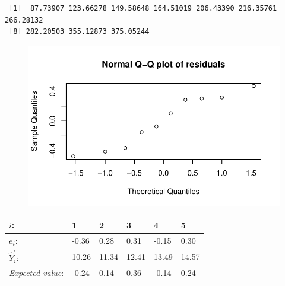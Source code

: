 \documentclass[
  letterpaper,
  DIV=11,
  numbers=noendperiod]{scrartcl}
\newenvironment{Shaded}{\begin{snugshade}}{\end{snugshade}}
\newcommand{\AttributeTok}[1]{\textcolor[rgb]{0.40,0.45,0.13}{#1}}
\newcommand{\FunctionTok}[1]{\textcolor[rgb]{0.28,0.35,0.67}{#1}}
\newcommand{\NormalTok}[1]{\textcolor[rgb]{0.00,0.23,0.31}{#1}}
\newcommand{\OtherTok}[1]{\textcolor[rgb]{0.00,0.23,0.31}{#1}}
\newcommand{\SpecialCharTok}[1]{\textcolor[rgb]{0.37,0.37,0.37}{#1}}
\newcommand{\StringTok}[1]{\textcolor[rgb]{0.13,0.47,0.30}{#1}}
\begin{document}
\begin{Shaded}
\end{Shaded}

\begin{verbatim}
 [1]  87.73907 123.66278 149.58648 164.51019 206.43390 216.35761 266.28132
 [8] 282.20503 355.12873 375.05244
\end{verbatim}

\begin{Shaded}
\end{Shaded}

\begin{figure}[H]

{\centering \includegraphics{sta9700_ch3_hw_files/figure-pdf/unnamed-chunk-41-1.pdf}

}

\end{figure}

\begin{longtable}[]{@{}llllll@{}}
\toprule()
\(i\): & 1 & 2 & 3 & 4 & 5 \\
\midrule()
\endhead
\(e_{i}\): & -0.36 & 0.28 & 0.31 & -0.15 & 0.30 \\
\(\hat Y_{i}^{'}\): & 10.26 & 11.34 & 12.41 & 13.49 & 14.57 \\
\emph{Expected value}: & -0.24 & 0.14 & 0.36 & -0.14 & 0.24 \\
\bottomrule()
\end{longtable}
\end{document}
